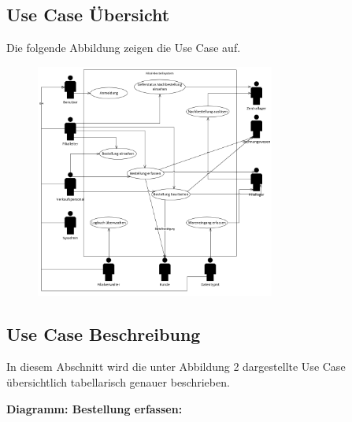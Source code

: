 \subsection{Use Case Übersicht}
Die folgende Abbildung zeigen die Use Case auf.

\begin{figure}[H]%
\centering
\includegraphics[width=0.7\textwidth]{Images/usecase-U.png}
\label{fig:usecase}
\end{figure}

\clearpage
\subsection{Use Case Beschreibung}
In diesem Abschnitt wird die unter Abbildung 2 dargestellte Use Case übersichtlich tabellarisch genauer beschrieben.






\newpage
\textbf{Diagramm: Bestellung erfassen:}

